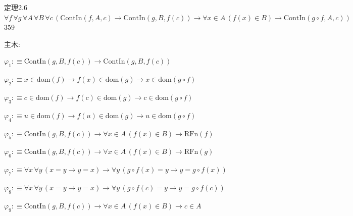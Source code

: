 \begin{fullproof}{定理2.6}{$\forall f\,\forall g\,\forall A\,\forall B\,\forall c\,(\mathrm{ContIn}(f,A,c) \to \mathrm{ContIn}(g,B,f(c)) \to \forall x \in A\,(f(x) \in B) \to \mathrm{ContIn}(g \circ f,A,c))$}{359}
\begin{ptree}
\noLine
{}
\end{ptree}
\noindent 主木:
\begin{ptree}
\noLine
{}
\noLine
{}
\noLine
{}
\end{ptree}
\begin{abbrevlist}
\item $\varphi_{1} :\equiv \mathrm{ContIn}(g,B,f(c)) \to \mathrm{ContIn}(g,B,f(c))$
\item $\varphi_{2} :\equiv x \in \mathrm{dom}(f) \to f(x) \in \mathrm{dom}(g) \to x \in \mathrm{dom}(g \circ f)$
\item $\varphi_{3} :\equiv c \in \mathrm{dom}(f) \to f(c) \in \mathrm{dom}(g) \to c \in \mathrm{dom}(g \circ f)$
\item $\varphi_{4} :\equiv u \in \mathrm{dom}(f) \to f(u) \in \mathrm{dom}(g) \to u \in \mathrm{dom}(g \circ f)$
\item $\varphi_{5} :\equiv \mathrm{ContIn}(g,B,f(c)) \to \forall x \in A\,(f(x) \in B) \to \mathrm{RFn}(f)$
\item $\varphi_{6} :\equiv \mathrm{ContIn}(g,B,f(c)) \to \forall x \in A\,(f(x) \in B) \to \mathrm{RFn}(g)$
\item $\varphi_{7} :\equiv \forall x\,\forall y\,(x = y \to y = x) \to \forall y\,(g \circ f(x) = y \to y = g \circ f(x))$
\item $\varphi_{8} :\equiv \forall x\,\forall y\,(x = y \to y = x) \to \forall y\,(g \circ f(c) = y \to y = g \circ f(c))$
\item $\varphi_{9} :\equiv \mathrm{ContIn}(g,B,f(c)) \to \forall x \in A\,(f(x) \in B) \to c \in A$

\end{abbrevlist}
\end{fullproof}
